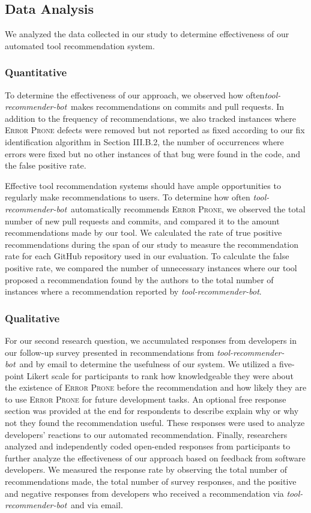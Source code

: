 \documentclass[sigconf,review,anonymous]{acmart}
\newcommand{\tool}{\textsl{tool-recommender-bot}}
\begin{document}
\subsection{Data Analysis}

We analyzed the data collected in our study to determine effectiveness of our automated tool recommendation system.

\subsubsection{Quantitative}

To determine the effectiveness of our approach, we observed how often\tool~makes recommendations on commits and pull requests. In addition to the frequency of recommendations, we also tracked instances where \textsc{Error Prone} defects were removed but not reported as fixed according to our fix identification algorithm in Section III.B.2, the number of occurrences where errors were fixed but no other instances of that bug were found in the code, and the false positive rate.

Effective tool recommendation systems should have ample opportunities to regularly make recommendations to users. To determine how often \tool~automatically recommends \textsc{Error Prone}, we observed the total number of new pull requests and commits, and compared it to the amount recommendations made by our tool. We calculated the rate of true positive recommendations during the span of our study to measure the recommendation rate for each GitHub repository used in our evaluation. To calculate the false positive rate, we compared the number of unnecessary instances where our tool proposed a recommendation found by the authors to the total number of instances where a recommendation reported by \tool.

\subsubsection{Qualitative}

For our second research question, we accumulated responses from developers in our follow-up survey presented in recommendations from \tool~and by email to determine the usefulness of our system. We utilized a five-point Likert scale for participants to rank how knowledgeable they were about the existence of \textsc{Error Prone} before the recommendation and how likely they are to use \textsc{Error Prone} for future development tasks. An optional free response section was provided at the end for respondents to describe explain why or why not they found the recommendation useful. These responses were used to analyze developers' reactions to our automated recommendation. Finally, researchers analyzed and independently coded open-ended responses from participants to further analyze the effectiveness of our approach based on feedback from software developers. We measured the response rate by observing the total number of recommendations made, the total number of survey responses, and the positive and negative responses from developers who received a recommendation via \tool~and via email.
\end{document}

